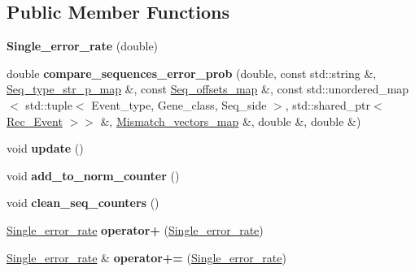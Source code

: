 \subsection*{Public Member Functions}
\begin{DoxyCompactItemize}
\item 
\mbox{\label{classSingle__error__rate_a687686cd400935103647436b27984330}} 
{\bfseries Single\+\_\+error\+\_\+rate} (double)
\item 
\mbox{\label{classSingle__error__rate_a142d9c5ad52f1f6fa20565c42158a426}} 
double {\bfseries compare\+\_\+sequences\+\_\+error\+\_\+prob} (double, const std\+::string \&, \hyperlink{classEnum__fast__memory__map}{Seq\+\_\+type\+\_\+str\+\_\+p\+\_\+map} \&, const \hyperlink{classEnum__fast__memory__dual__key__map}{Seq\+\_\+offsets\+\_\+map} \&, const std\+::unordered\+\_\+map$<$ std\+::tuple$<$ Event\+\_\+type, Gene\+\_\+class, Seq\+\_\+side $>$, std\+::shared\+\_\+ptr$<$ \hyperlink{classRec__Event}{Rec\+\_\+\+Event} $>$$>$ \&, \hyperlink{classEnum__fast__memory__map}{Mismatch\+\_\+vectors\+\_\+map} \&, double \&, double \&)
\item 
\mbox{\label{classSingle__error__rate_a0d4fb62ed45df43f95d7f85e5150639f}} 
void {\bfseries update} ()
\item 
\mbox{\label{classSingle__error__rate_afb8ba0c35a20ff9c83d71eadc21013c7}} 
void {\bfseries add\+\_\+to\+\_\+norm\+\_\+counter} ()
\item 
\mbox{\label{classSingle__error__rate_a0d6d6f3ce09bf9a9a01426557bc11075}} 
void {\bfseries clean\+\_\+seq\+\_\+counters} ()
\item 
\mbox{\label{classSingle__error__rate_ac5d91ac7d2fbd646210a04a7f56df00d}} 
\hyperlink{classSingle__error__rate}{Single\+\_\+error\+\_\+rate} {\bfseries operator+} (\hyperlink{classSingle__error__rate}{Single\+\_\+error\+\_\+rate})
\item 
\mbox{\label{classSingle__error__rate_a34faf13d5f4a2fca1c2acc8bc69b23c7}} 
\hyperlink{classSingle__error__rate}{Single\+\_\+error\+\_\+rate} \& {\bfseries operator+=} (\hyperlink{classSingle__error__rate}{Single\+\_\+error\+\_\+rate})
$$
\end{DoxyCompactItemize}
